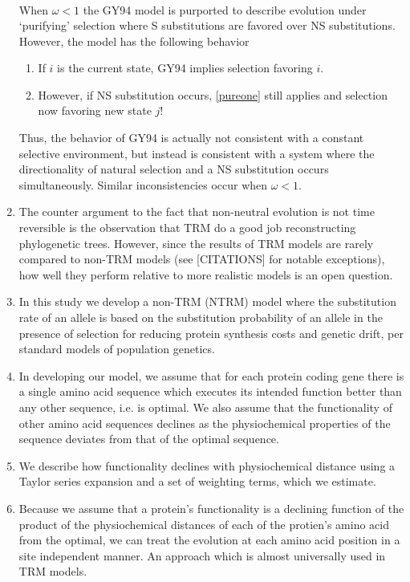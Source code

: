 \documentclass{article}
\begin{document}
\begin{enumerate}
\begin{align*}
       \end{align*}
When $\omega <1$ the GY94 model is purported to describe evolution under `purifying' selection where S substitutions are favored over NS substitutions.
However, the model has the following behavior
    \begin{enumerate}
    \item If $i$ is the current state, GY94 implies selection favoring $i$. \label{pureone}
    \item However, if NS substitution occurs, \ref{pureone} still applies and selection now favoring new state $j$!
    \end{enumerate}
Thus, the behavior of GY94 is actually not consistent with a constant selective environment, but instead is consistent with a system where the directionality of natural selection and a NS substitution occurs simultaneously.
Similar inconsistencies occur when $\omega < 1$.
\item The counter argument to the fact that non-neutral evolution is not time reversible is the observation that TRM do a good job reconstructing phylogenetic trees. 
However, since the results of TRM models are rarely compared to non-TRM models (see [CITATIONS] for notable exceptions), how well they perform relative to more realistic models is an open question.
\item In this study we develop a non-TRM (NTRM) model where the substitution rate of an allele is based on the substitution probability of an allele in the presence of selection for reducing protein synthesis costs and genetic drift, per standard models of population genetics.
\item In developing our model, we assume that for each protein coding gene there is a single amino acid sequence which executes its intended function better than any other sequence, i.e. is optimal.
We also assume that the functionality of other amino acid sequences declines as the physiochemical properties of the sequence deviates from that of the optimal sequence.
\item We describe how functionality  declines with physiochemical distance using a Taylor series expansion and a set of weighting terms, which we estimate.
\item Because we assume that a protein's functionality is a declining function of the product of the physiochemical distances of each of the protien's amino acid from the optimal, we can treat the evolution at each amino acid position in a site independent manner. 
An approach which is almost universally used in TRM models.

\end{enumerate}
\end{document}
